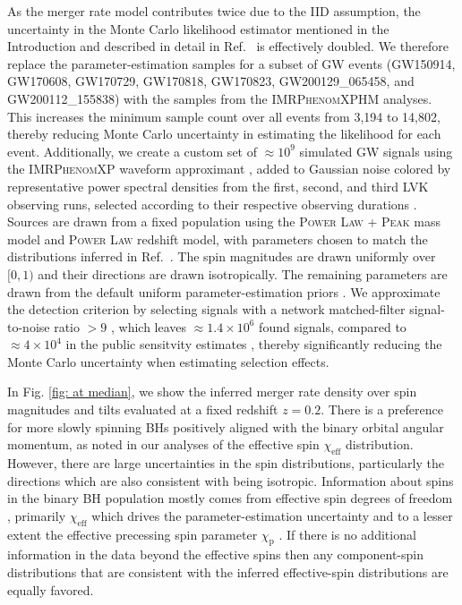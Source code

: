 \begin{refsection}
As the merger rate model contributes twice due to the IID assumption, the uncertainty in the Monte Carlo likelihood estimator mentioned in the Introduction and described in detail in Ref.~\cite{Heinzel:2024jlc} is effectively doubled. We therefore replace the parameter-estimation samples for a subset of GW events (GW150914, GW170608, GW170729, GW170818, GW170823, GW200129\_065458, and GW200112\_155838) with the samples from the \textsc{IMRPhenomXPHM} \cite{Pratten:2020ceb} analyses. This increases the minimum sample count over all events from 3,194 to 14,802, thereby reducing Monte Carlo uncertainty in estimating the likelihood for each event. Additionally, we create a custom set of $\approx 10^9$ simulated GW signals using the \textsc{IMRPhenomXP} waveform approximant \cite{Pratten:2020ceb}, added to Gaussian noise colored by representative power spectral densities from the first, second, and third LVK observing runs, selected according to their respective observing durations \cite{KAGRA:2013rdx}. Sources are drawn from a fixed population using the \textsc{Power Law + Peak} mass model and \textsc{Power Law} redshift model, with parameters chosen to match the distributions inferred in Ref.~\cite{KAGRA:2021duu}. The spin magnitudes are drawn uniformly over $[0,1)$ and their directions are drawn isotropically. The remaining parameters are drawn from the default uniform parameter-estimation priors \cite{LIGOScientific:2021djp}. We approximate the detection criterion by selecting signals with a network matched-filter signal-to-noise ratio $>9$ \cite{Essick:2023toz}, which leaves $\approx1.4\times10^6$ found signals, compared to $\approx4\times10^4$ in the public sensitvity estimates \cite{ligo_scientific_collaboration_and_virgo_2023_7890398}, thereby significantly reducing the Monte Carlo uncertainty when estimating selection effects.

In Fig. \ref{fig: at median}, we show the inferred merger rate density over spin magnitudes and tilts evaluated at a fixed redshift $z=0.2$. There is a preference for more slowly spinning BHs positively aligned with the binary orbital angular momentum, as noted in our analyses of the
effective spin $\chi_\mathrm{eff}$ distribution. However, there are large uncertainties in the spin distributions, particularly the directions which are also consistent with being isotropic. Information about spins in the binary BH population mostly comes from effective spin degrees of freedom \cite{Miller:2024sui}, primarily $\chi_\mathrm{eff}$ which drives the parameter-estimation uncertainty and to a lesser extent the effective precessing spin parameter $\chi_\mathrm{p}$ \cite{Hannam:2013oca, Schmidt:2014iyl}. If there is no additional information in the data beyond the effective spins then any component-spin distributions that are consistent with the inferred effective-spin distributions are equally favored.


\end{refsection}
